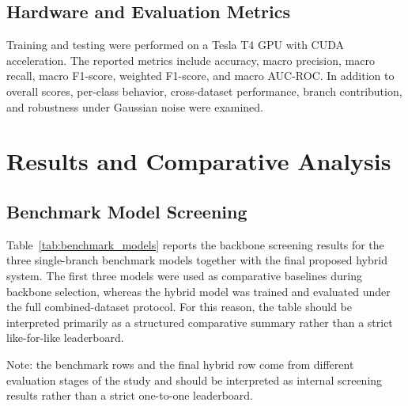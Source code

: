 \documentclass[conference]{IEEEtran}
\begin{document}
\subsection{Hardware and Evaluation Metrics}
Training and testing were performed on a Tesla T4 GPU with CUDA acceleration. The reported metrics include accuracy, macro precision, macro recall, macro F1-score, weighted F1-score, and macro AUC-ROC. In addition to overall scores, per-class behavior, cross-dataset performance, branch contribution, and robustness under Gaussian noise were examined.

\section{Results and Comparative Analysis}
\subsection{Benchmark Model Screening}
Table~\ref{tab:benchmark_models} reports the backbone screening results for the three single-branch benchmark models together with the final proposed hybrid system. The first three models were used as comparative baselines during backbone selection, whereas the hybrid model was trained and evaluated under the full combined-dataset protocol. For this reason, the table should be interpreted primarily as a structured comparative summary rather than a strict like-for-like leaderboard.

\begin{table}[htbp]
\caption{Internal model comparison used for backbone screening and final reporting. The first three rows summarize single-branch benchmark models, while the last row reports the final hybrid under the combined seven-class protocol.}
\label{tab:benchmark_models}
\centering
{}
\vspace{2pt}
{\footnotesize Note: the benchmark rows and the final hybrid row come from different evaluation stages of the study and should be interpreted as internal screening results rather than a strict one-to-one leaderboard.}
\end{table}
\end{document}
